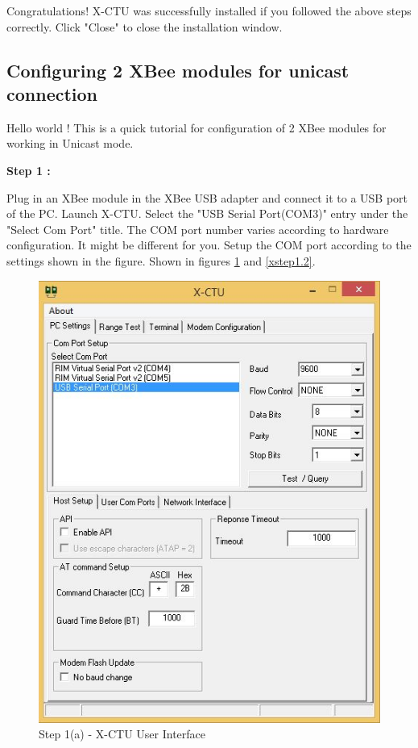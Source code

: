 \begin{flushleft}
Congratulations! X-CTU was successfully installed if you followed the above steps correctly. Click "Close" to close the installation window.

\newpage

\subsection{\textbf{Configuring 2 XBee modules for unicast connection}}

Hello world ! This is a quick tutorial for configuration of 2 XBee modules for working in Unicast mode.

\medskip

\textbf{Step 1 :}

\medskip

Plug in an XBee module in the XBee USB adapter and connect it to a USB port of the PC. Launch X-CTU. Select the "USB Serial Port(COM3)" entry under the "Select Com Port" title. The COM port number varies according to hardware configuration. It might be different for you. Setup the COM port according to the settings shown in the figure. Shown in figures \ref{xstep1.1} and \ref{xstep1.2}.

\begin{figure}[h]
\begin{center}
\includegraphics[scale=0.5]{zigbee_8}
\end{center}
\caption{Step 1(a) - X-CTU User Interface}
\label{xstep1.1}
\end{figure}
\medskip


\end{flushleft}
